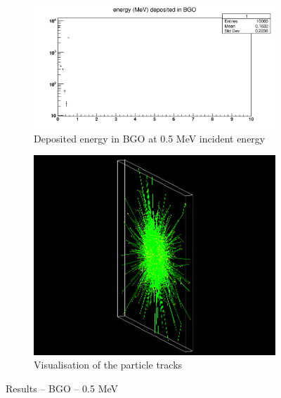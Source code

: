 \documentclass{article}
\begin{document}
\begin{figure}[H]
\centering
\begin{subfigure}{.5\textwidth}
  \centering
  \includegraphics[width=\linewidth]{images/task1/BGO_05MeV.png}
  \caption{Deposited energy in BGO at 0.5 MeV incident energy}
\end{subfigure}%
\begin{subfigure}{.5\textwidth}
  \centering
  \includegraphics[width=\linewidth]{images/task1/BGO_05MeV_10000.png}
  \caption{Visualisation of the particle tracks}
\end{subfigure}
\caption{Results – BGO – 0.5 MeV}
\end{figure}
\end{document}
